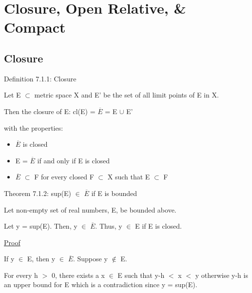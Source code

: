 \newpage
\section[Day 7: Closure, Open Relative, and Compact]
{Closure, Open Relative, \& Compact}

\subsection{ Closure }

{ \color{blue} Definition 7.1.1: Closure } 

	\begin{adjustbox}{minipage=14cm, right}
        Let E $\subset$ metric space X and E' be the set of all
        limit points of E in X.

        \qquad Then the closure of E:
            \qquad cl(E) = $\overline{E}$ = E $\cup$ E'

        with the properties:
	\end{adjustbox}

    \begin{itemize}[leftmargin=2cm, itemsep=0.4em]
        \item $\overline{E}$ is closed
        
        \item E = $\overline{E}$ if and only if E is closed
        
        \item $\overline{E}$ $\subset$ F for every closed F $\subset$ X
        such that E $\subset$ F \\
    \end{itemize}

{ \color{red} Theorem 7.1.2: sup(E) $\in$ $\overline{E}$ if E is bounded}

    \begin{adjustbox}{minipage=14cm, right}
        Let non-empty set of real numbers, E, be bounded above.
        
        Let y = sup(E). Then, y $\in$ $\overline{E}$.
        Thus, y $\in$ E if E is closed.
    \end{adjustbox}

{ \color{magenta} \underline{Proof} } 
	
	If y $\in$ E, then y $\in$ $\overline{E}$. Suppose y $\not \in$ E.

	For every h $>$ 0, there exists a x $\in$ E such that y-h $<$ x $<$ y
	otherwise y-h is an upper bound for E which is a contradiction
	since y = sup(E).

